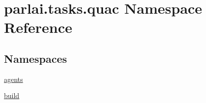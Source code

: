 \hypertarget{namespaceparlai_1_1tasks_1_1quac}{}\section{parlai.\+tasks.\+quac Namespace Reference}
\label{namespaceparlai_1_1tasks_1_1quac}
\subsection*{Namespaces}
\begin{DoxyCompactItemize}
\item 
 \hyperlink{namespaceparlai_1_1tasks_1_1quac_1_1agents}{agents}
\item 
 \hyperlink{namespaceparlai_1_1tasks_1_1quac_1_1build}{build}
\end{DoxyCompactItemize}
